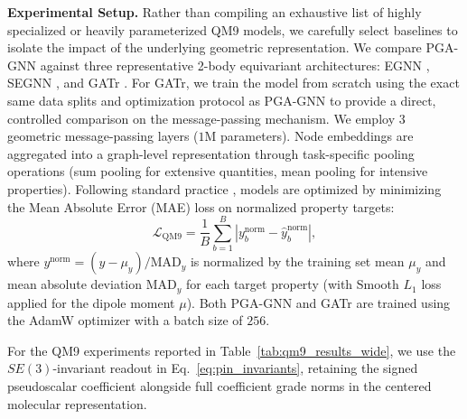 \documentclass[10pt]{article}
\begin{document}
\noindent\textbf{Experimental Setup.}
Rather than compiling an exhaustive list of highly specialized or heavily parameterized QM9 models, we carefully select baselines to isolate the impact of the underlying geometric representation. We compare PGA-GNN against three representative 2-body equivariant architectures: EGNN \citep{egnn}, SEGNN \citep{segnn}, and GATr \citep{gatr}. For GATr, we train the model from scratch using the exact same data splits and optimization protocol as PGA-GNN to provide a direct, controlled comparison on the message-passing mechanism.
We employ 3 geometric message-passing layers ($1$M parameters). Node embeddings are aggregated into a graph-level representation through task-specific pooling operations (sum pooling for extensive quantities, mean pooling for intensive properties). Following standard practice \citep{cormorant}, models are optimized by minimizing the Mean Absolute Error (MAE) loss on normalized property targets:
\begin{equation}
    \mathcal{L}_{\text{QM9}} = \frac{1}{B} \sum_{b=1}^{B} \left| y_b^{\text{norm}} - \hat{y}_b^{\text{norm}} \right|,
    \label{eq:loss_qm9}
\end{equation}
where $y^{\text{norm}} = (y - \mu_y) / \mathrm{MAD}_y$ is normalized by the training set mean $\mu_y$ and mean absolute deviation $\mathrm{MAD}_y$ for each target property (with Smooth $L_1$ loss applied for the dipole moment $\mu$). Both PGA-GNN and GATr are trained using the AdamW optimizer with a batch size of $256$.

For the QM9 experiments reported in Table~\ref{tab:qm9_results_wide}, we use the $SE(3)$-invariant readout in Eq.~\ref{eq:pin_invariants}, retaining the signed pseudoscalar coefficient alongside full coefficient grade norms in the centered molecular representation.
\end{document}
